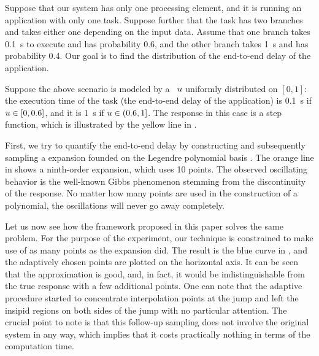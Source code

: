 Suppose that our system has only one processing element, and it is running an
application with only one task. Suppose further that the task has two branches
and takes either one depending on the input data. Assume that one branch takes
0.1~s to execute and has probability 0.6, and the other branch takes 1~s and has
probability 0.4. Our goal is to find the distribution of the end-to-end delay of
the application. 

Suppose the above scenario is modeled by a \rv\ $u$ uniformly distributed on
$[0, 1]$: the execution time of the task (the end-to-end delay of the
application) is 0.1~s if $u \in [0, 0.6]$, and it is 1~s if $u \in (0.6, 1]$.
The response in this case is a step function, which is illustrated by the yellow
line in .

First, we try to quantify the end-to-end delay by constructing and subsequently
sampling a  expansion founded on the Legendre polynomial basis
\cite{xiu2010}. The orange line in  shows a ninth-order 
expansion, which uses 10 points.  The observed oscillating behavior is the well-known Gibbs
phenomenon stemming from the discontinuity of the response. No matter how many
points are used in the construction of a polynomial, the oscillations will never
go away completely.

Let us now see how the framework proposed in this paper solves the same problem.
For the purpose of the experiment, our technique is constrained to make use of
as many points as the  expansion did. The result is the blue curve in
, and the adaptively chosen points are plotted on the
horizontal axis. It can be seen that the approximation is good, and, in fact, it
would be indistinguishable from the true response with a few additional points.
One can note that the adaptive procedure started to concentrate interpolation
points at the jump and left the insipid regions on both sides of the jump with
no particular attention.  The crucial point to note is that this follow-up sampling
does not involve the original system in any way, which implies that it costs
practically nothing in terms of the computation time.

